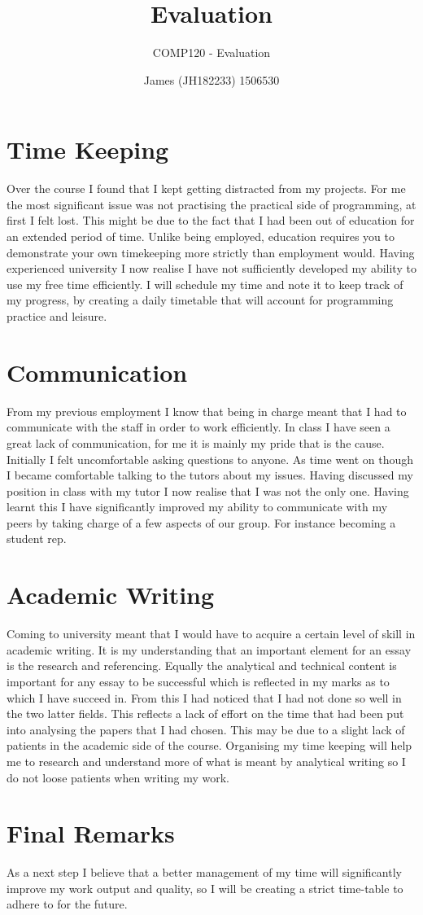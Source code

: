 \documentclass{scrartcl}
\title{Evaluation}
\subtitle{COMP120 - Evaluation}
\author{James (JH182233) 1506530}
\begin{document}
\maketitle

\section{Time Keeping}

Over the course I found that I kept getting distracted from my projects. For me the most significant issue was not practising the practical side of programming, at first I felt lost. This might be due to the fact that I had been out of education for an extended period of time. Unlike being employed, education requires you to demonstrate your own timekeeping more strictly than employment would. Having experienced university I now realise I have not sufficiently developed my ability to use my free time efficiently. I will schedule my time and note it to keep track of my progress, by creating a daily timetable that will account for programming practice and leisure.

\section{Communication}

From my previous employment I know that being in charge meant that I had to communicate with the staff in order to work efficiently. In class I have seen a great lack of communication, for me it is mainly my pride that is the cause. Initially I felt uncomfortable asking questions to anyone. As time went on though I became comfortable talking to the tutors about my issues. Having discussed my position in class with my tutor I now realise that I was not the only one. Having learnt this I have significantly improved my ability to communicate with my peers by taking charge of a few aspects of our group. For instance becoming a student rep. 

\section{Academic Writing}

Coming to university meant that I would have to acquire a certain level of skill in academic writing. It is my understanding that an important element for an essay is the research and referencing. Equally the analytical and technical content is important for any essay to be successful which is reflected in my marks as to which I have succeed in. From this I had noticed that I had not done so well in the two latter fields. This reflects a lack of effort on the time that had been put into analysing the papers that I had chosen. This may be due to a slight lack of patients in the academic side of the course. Organising my time keeping will help me to research and understand more of what is meant by analytical writing so I do not loose patients when writing my work.

\section{Final Remarks}

As a next step I believe that a better management of my time will significantly improve my work output and quality, so I will be creating a strict time-table to adhere to for the future.



\end{document}
